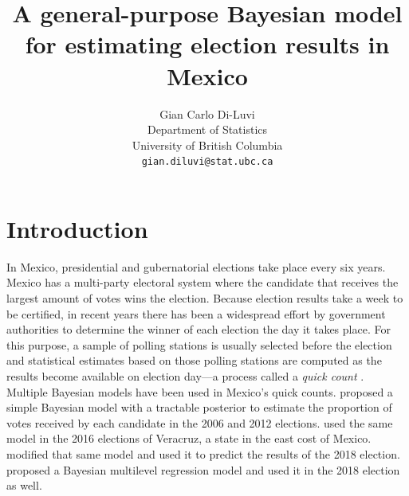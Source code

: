 \documentclass{article}
\title{A general-purpose Bayesian model for estimating election results in Mexico}
\author{%
  Gian Carlo Di-Luvi \\
  Department of Statistics\\
  University of British Columbia \\
  \texttt{gian.diluvi@stat.ubc.ca}
}
\begin{document}
\maketitle




\section{Introduction} \label{sec:intro}


In Mexico, presidential and gubernatorial elections take place every six years. Mexico has a multi-party electoral system where the candidate that receives the largest amount of votes wins the election. Because election results take a week to be certified, in recent years there has been a widespread effort by government authorities to determine the winner of each election the day it takes place. For this purpose, a sample of polling stations is usually selected before the election and statistical estimates based on those polling stations are computed as the results become available on election day---a process called a \textit{quick count} \citep{carrera2019}.
\\



Multiple Bayesian models have been used in Mexico's quick counts. \citet{mendoza-nieto2016} proposed a simple Bayesian model with a tractable posterior to estimate the proportion of votes received by each candidate in the 2006 and 2012 elections. \citet{cerrillo2019} used the same model in the 2016 elections of Veracruz, a state in the east cost of Mexico. \citet{diluvi2018} modified that same model and used it to predict the results of the 2018 election. \citet{anzarut2018} proposed a Bayesian multilevel regression model and used it in the 2018 election as well.
\\
\end{document}
